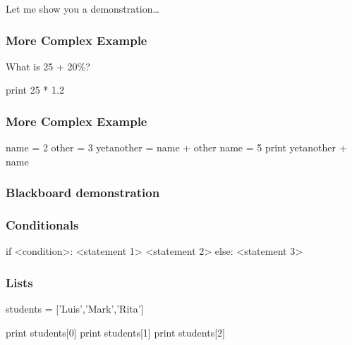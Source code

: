 \begin{frame}[fragile]

\bigskip
\bigskip
\bigskip
Let me show you a demonstration\ldots



\end{frame}

\begin{frame}[fragile]
\frametitle{More Complex Example}

What is 25 + 20\%?

\pause
\begin{python}
print 25 * 1.2
\end{python}
\end{frame}

\begin{frame}[fragile]
\frametitle{More Complex Example}

\begin{python}
name = 2
other = 3
yetanother = name + other
name = 5
print yetanother + name
\end{python}
\end{frame}

\begin{frame}[fragile]
\frametitle{Blackboard demonstration}

\end{frame}

\begin{frame}[fragile]
\frametitle{Conditionals}

\begin{python}

if <condition>:
    <statement 1>
    <statement 2>
else:
    <statement 3>

\end{python}
\end{frame}

\begin{frame}[fragile]
\frametitle{Lists}

\begin{python}

students = ['Luis','Mark','Rita']

print students[0]
print students[1]
print students[2]
\end{python}

\end{frame}

